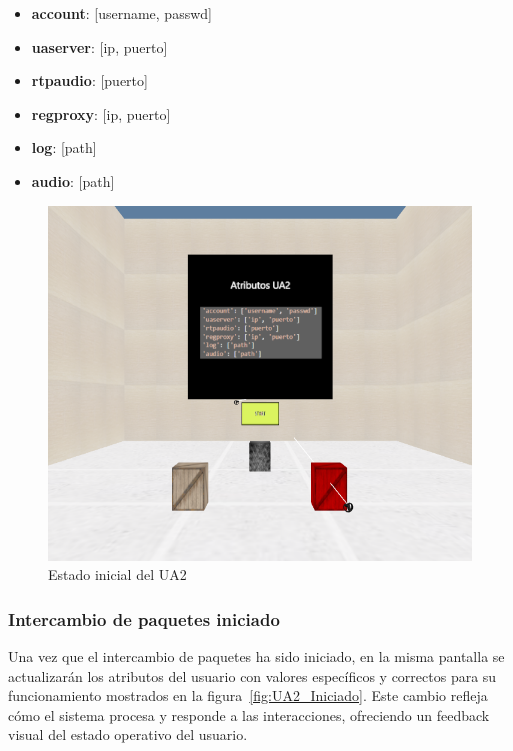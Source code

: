 \documentclass[a4paper, 12pt]{book}
\begin{document}
\begin{itemize}
  \item \textbf{account}: [username, passwd]
  \item \textbf{uaserver}: [ip, puerto]
  \item \textbf{rtpaudio}: [puerto]
  \item \textbf{regproxy}: [ip, puerto]
  \item \textbf{log}: [path]
  \item \textbf{audio}: [path]
\end{itemize}

\begin{figure}
  \centering
  \includegraphics[width=15cm, keepaspectratio]{img/resultados/UA2_NoIniciado.png}
  \caption{Estado inicial del UA2}
  \label{fig:UA2_NoIniciado}
\end{figure}


\subsubsection{Intercambio de paquetes iniciado}
\label{subsubsec:Intercambio_Iniciado}
Una vez que el intercambio de paquetes ha sido iniciado, en la misma pantalla se 
actualizarán los atributos del usuario con valores específicos y correctos para su funcionamiento mostrados en la figura~\ref{fig:UA2_Iniciado}.  
Este cambio refleja cómo el sistema procesa y responde a las interacciones, ofreciendo un feedback visual del estado operativo del usuario.
\end{document}
